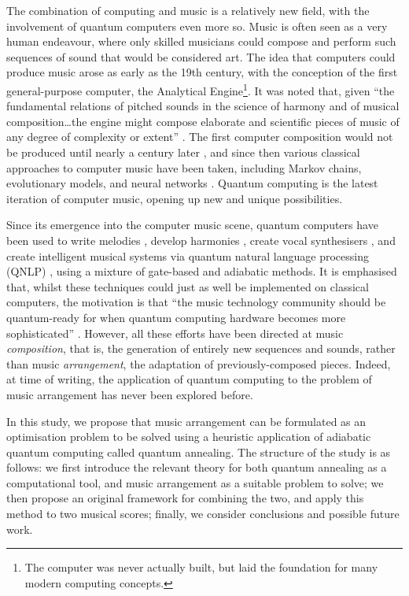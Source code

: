 \documentclass[twocolumn]{article}
\theoremstyle{definition}
\begin{document}
The combination of computing and music is a relatively new field, with the involvement of quantum computers even more so. Music is often seen as a very human endeavour, where only skilled musicians could compose and perform such sequences of sound that would be considered art. The idea that computers could produce music arose as early as the 19th century, with the conception of the first general-purpose computer, the Analytical Engine\footnote{The computer was never actually built, but laid the foundation for many modern computing concepts.}. It was noted that, given ``the fundamental relations of pitched sounds in the science of harmony and of musical composition\dots the engine might compose elaborate and scientific pieces of music of any degree of complexity or extent'' \cite{lovelace_sketch_1843}. The first computer composition would not be produced until nearly a century later \cite{hiller_experimental_1959}, and since then various classical approaches to computer music have been taken, including Markov chains, evolutionary models, and neural networks \cite{fernandez_ai_2014}. Quantum computing is the latest iteration of computer music, opening up new and unique possibilities.

Since its emergence into the computer music scene, quantum computers have been used to write melodies \cite{miranda_teaching_2022}, develop harmonies \cite{arya_music_2022}, create vocal synthesisers \cite{miranda_quantum_2020}, and create intelligent musical systems via quantum natural language processing (QNLP) \cite{miranda_quantum_2021}, using a mixture of gate-based and adiabatic methods. It is emphasised that, whilst these techniques could just as well be implemented on classical computers, the motivation is that ``the music technology community should be quantum-ready for when quantum computing hardware becomes more sophisticated'' \cite{miranda_quantum_2020}. However, all these efforts have been directed at music \emph{composition}, that is, the generation of entirely new sequences and sounds, rather than music \emph{arrangement}, the adaptation of previously-composed pieces. Indeed, at time of writing, the application of quantum computing to the problem of music arrangement has never been explored before.

In this study, we propose that music arrangement can be formulated as an optimisation problem to be solved using a heuristic application of adiabatic quantum computing called quantum annealing.
The structure of the study is as follows: we first introduce the relevant theory for both quantum annealing as a computational tool, and music arrangement as a suitable problem to solve; we then propose an original framework for combining the two, and apply this method to two musical scores; finally, we consider conclusions and possible future work.
\end{document}
